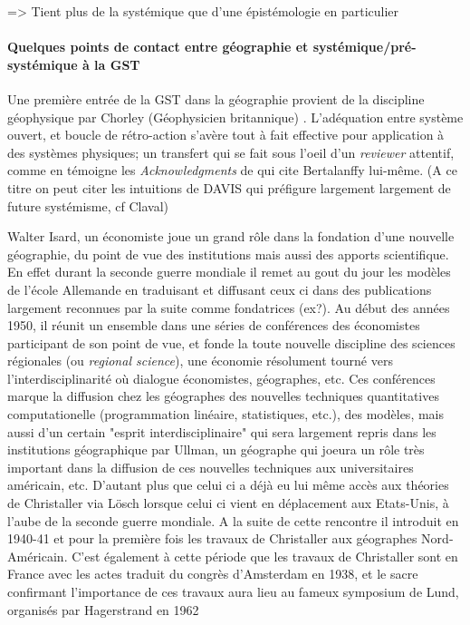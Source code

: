{=> Tient plus de la systémique que d'une épistémologie en particulier



\paragraph{Quelques points de contact entre géographie et systémique/pré-systémique à la GST }

Une première entrée de la GST dans la géographie provient de la discipline géophysique par Chorley (Géophysicien britannique) \autocite{Chorley1962}.  L'adéquation entre système ouvert, et boucle de rétro-action s'avère tout à fait effective pour application à des systèmes physiques; un transfert qui se fait sous l'oeil d'un \textit{reviewer} attentif, comme en témoigne les \textit{Acknowledgments} de \autocite{Chorley1962} qui cite Bertalanffy lui-même. (A ce titre on peut citer les intuitions de DAVIS qui préfigure largement largement de future systémisme, cf Claval)  

Walter Isard, un économiste joue un grand rôle dans la fondation d'une nouvelle géographie, du point de vue des institutions mais aussi des apports scientifique. En effet durant la seconde guerre mondiale il remet au gout du jour les modèles de l'école Allemande en traduisant et diffusant ceux ci dans des publications largement reconnues par la suite comme fondatrices (ex?). Au début des années 1950, il réunit un ensemble dans une séries de conférences des économistes participant de son point de vue, et fonde la toute nouvelle discipline des sciences régionales (ou \textit{regional science}), une économie résolument tourné vers l'interdisciplinarité où dialogue économistes, géographes, etc. Ces conférences marque la diffusion chez les géographes des nouvelles techniques quantitatives computationelle (programmation linéaire, statistiques, etc.), des modèles, mais aussi d'un certain "esprit interdisciplinaire" qui sera largement repris dans les institutions géographique par Ullman, un géographe qui joeura un rôle très important dans la diffusion de ces nouvelles techniques aux universitaires américain, etc. D'autant plus que celui ci a déjà eu lui même accès aux théories de Christaller via Lösch lorsque celui ci vient en déplacement aux Etats-Unis, à l'aube de la seconde guerre mondiale. A la suite de cette rencontre il introduit en 1940-41 et pour la première fois les travaux de Christaller aux géographes Nord-Américain. C'est également à cette période que les travaux de Christaller sont en France avec les actes traduit du congrès d'Amsterdam en 1938, et le sacre confirmant l'importance de ces travaux aura lieu au fameux symposium de Lund, organisés par Hagerstrand en 1962 \autocite{Berry1970}  %

}
